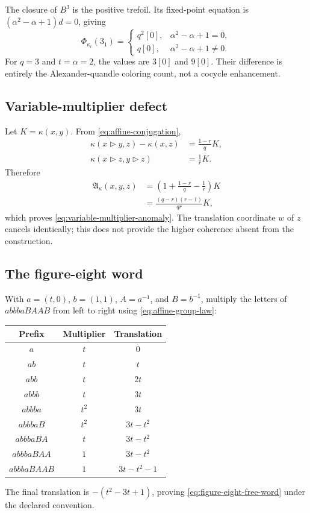 The closure of $B^3$ is the positive trefoil.  Its fixed-point equation is
$(\alpha^2-\alpha+1)d=0$, giving
\begin{equation}
 \Phi_{\kappa_t}(3_1)=
 \begin{cases}
  q^2[0],&\alpha^2-\alpha+1=0,\\
  q[0],&\alpha^2-\alpha+1\ne0.
 \end{cases}
 \label{eq:trefoil-collapsed-state-sum}
\end{equation}
For $q=3$ and $t=\alpha=2$, the values are $3[0]$ and $9[0]$.  Their difference
is entirely the Alexander-quandle coloring count, not a cocycle enhancement.

\subsection{Variable-multiplier defect}

Let $K=\kappa(x,y)$.  From \eqref{eq:affine-conjugation},
\begin{align*}
 \kappa(x\triangleright y,z)-\kappa(x,z)
 &=\frac{1-r}{q}K,\\
 \kappa(x\triangleright z,y\triangleright z)
 &=\frac1rK.
\end{align*}
Therefore
\begin{align*}
 \mathfrak A_\kappa(x,y,z)
 &=\left(1+\frac{1-r}{q}-\frac1r\right)K\\
 &=\frac{(q-r)(r-1)}{qr}K,
\end{align*}
which proves \eqref{eq:variable-multiplier-anomaly}.  The translation coordinate
$w$ of $z$ cancels identically; this does not provide the higher coherence absent
from the construction.

\subsection{The figure-eight word}

With $a=(t,0)$, $b=(1,1)$, $A=a^{-1}$, and $B=b^{-1}$, multiply the letters of
$abbbaBAAB$ from left to right using \eqref{eq:affine-group-law}:
\begin{center}
\small
\begin{tabular}{ccc}
\toprule
Prefix & Multiplier & Translation \\
\midrule
$a$ & $t$ & $0$ \\
$ab$ & $t$ & $t$ \\
$abb$ & $t$ & $2t$ \\
$abbb$ & $t$ & $3t$ \\
$abbba$ & $t^2$ & $3t$ \\
$abbbaB$ & $t^2$ & $3t-t^2$ \\
$abbbaBA$ & $t$ & $3t-t^2$ \\
$abbbaBAA$ & $1$ & $3t-t^2$ \\
$abbbaBAAB$ & $1$ & $3t-t^2-1$ \\
\bottomrule
\end{tabular}
\end{center}
The final translation is $-(t^2-3t+1)$, proving
\eqref{eq:figure-eight-free-word} under the declared convention.
